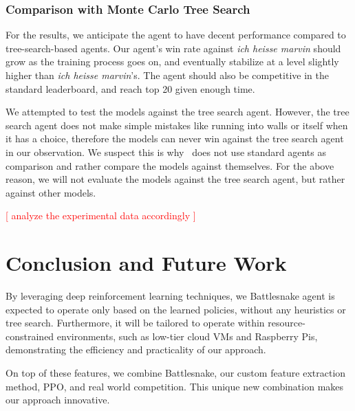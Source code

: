 \documentclass[conference]{IEEEtran}
\newcommand{\todo}[1]{\textcolor{red}{[ #1 ]}}
\begin{document}
\subsubsection{Comparison with Monte Carlo Tree Search}

For the results,
we anticipate the agent to have decent performance compared to tree-search-based
agents. Our agent's win rate against \emph{ich heisse marvin}
should grow as the training process goes on,
and eventually stabilize at a level slightly higher than \emph{ich heisse
    marvin}'s. The agent should also be competitive in the standard leaderboard,
and reach top 20 given enough time.

We attempted to test the models against the tree search agent. However,
the tree search agent does not make simple mistakes like running into walls or
itself when it has a choice,
therefore the models can never win against the tree search agent in our
observation. We suspect this is why~\cite{chung2020battlesnake}
does not use standard agents as comparison and rather compare the models against
themselves. For the above reason,
we will not evaluate the models against the tree search agent,
but rather against other models.

\todo{analyze the experimental data accordingly}

\section{Conclusion and Future Work}

By leveraging deep reinforcement learning techniques,
we Battlesnake agent is expected to operate only based on the learned policies,
without any heuristics or tree search.
Furthermore, it will be tailored to operate within resource-constrained
environments, such as low-tier cloud VMs and Raspberry Pis,
demonstrating the efficiency and practicality of our approach.

On top of these features, we combine Battlesnake,
our custom feature extraction method, PPO, and real world competition.
This unique new combination makes our approach innovative.

\printbibliography
\end{document}
